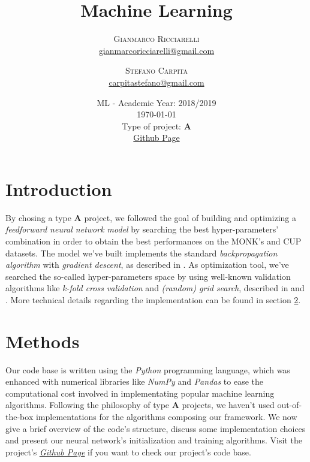 \documentclass[11pt,twoside]{article}
\title{Machine Learning} %
\author{%
\textsc{Gianmarco Ricciarelli} \\[1ex] %
\normalsize \href{mailto:john@smith.com}{gianmarcoricciarelli@gmail.com} %
\and %
\textsc{Stefano Carpita} \\[1ex] %
\normalsize \href{mailto:jane@smith.com}{carpitastefano@gmail.com} %
}
\date{
    ML - Academic Year: 2018/2019 \\
    {\vspace{0.25cm}}
    \today \\
    {\vspace{0.25cm}}
    Type of project: \textbf{A} \\
    {\vspace{0.25cm}}
    \href{https://github.com/germz01/machinel-learning}{Github Page}
}
\begin{document}
\maketitle


\section{Introduction} %
\label{sec:introduction}
    By chosing a type \textbf{A} project, we followed the goal of building and optimizing a
    \textit{feedforward neural network model} by searching the best hyper-parameters' combination in order to
    obtain the best performances on the MONK's and CUP datasets. The model we've built implements the
    standard \textit{backpropagation algorithm} with \textit{gradient descent}, as described in
    \cite{deep_learning}. As optimization tool, we've searched the so-called hyper-parameters space by using
    well-known validation algorithms like \textit{k-fold cross validation} and \textit{(random) grid search},
    described in \cite{deep_learning} and \cite{random_search}. More technical details regarding the
    implementation can be found in section \ref{sec:methods}.


\section{Methods} %
\label{sec:methods}
    Our code base is written using the \textit{Python} programming language, which was enhanced with
    numerical libraries like \textit{NumPy} and \textit{Pandas} to ease the computational cost involved in
    implementating popular machine learning algorithms. %
    Following the philosophy of type \textbf{A} projects, we haven't used
    out-of-the-box implementations for the algorithms composing our framework. We now give a brief overview of
    the code's structure, discuss some implementation choices and present our neural network's initialization
    and training algorithms. Visit the project's
    \href{https://github.com/germz01/machinel-learning}{\underline{\textit{Github Page}}} if you want to check
    our project's code base.
\end{document}
